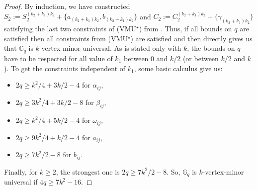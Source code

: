 \documentclass[10pt,a4paper]{article}
\newcommand{\gs}{\geqslant}
\newcommand{\G}[1][q]{\mathbb{G}_{#1}}
\begin{document}
\begin{proof}
        
        By induction, we have constructed $S_2 := S_2^{(k_2+k_1)k_2} + \{a_{(k_2+k_1)k_2}, b_{(k_2+k_1)k_2}\}$ and $C_2 := C_2^{(k_2+k_1)k_2} + \{\gamma_{(k_2+k_1)k_2}\}$ satisfying the last two constraints of (VMU$^\star$) from . Thus, if all bounds on $q$ are satisfied then all constraints from (VMU$^\star$) are satisfied and then  directly gives us that $\G$ is $k$-vertex-minor universal. As  is stated only with $k$, the bounds on $q$ have to be respected for all value of $k_1$ between 0 and $k/2$ (or between $k/2$ and $k$). To get the constraints independent of $k_1$, some basic calculus give us:
        \begin{itemize}
            \item  $2q \gs k^2/4 + 3k/2 -4$ for $\alpha_{ij}$,
            \item $2q \gs 3k^2/4 + 3k/2 - 8$ for $\beta_{ij}$,
            \item $2q \gs k^2/4+5k/2-4$ for $\omega_{ij}$,
            \item $2q \gs 9k^2/4+k/2-4$ for $a_{ij}$,
            \item $2q \gs 7k^2/2-8$ for $b_{ij}$.
        \end{itemize}
        Finally, for $k \gs 2$, the strongest one is $2q \gs 7k^2/2-8$. So, $\G$ is $k$-vertex-minor universal if $4q \gs 7k^2-16$. 
    \end{proof}
\end{document}
